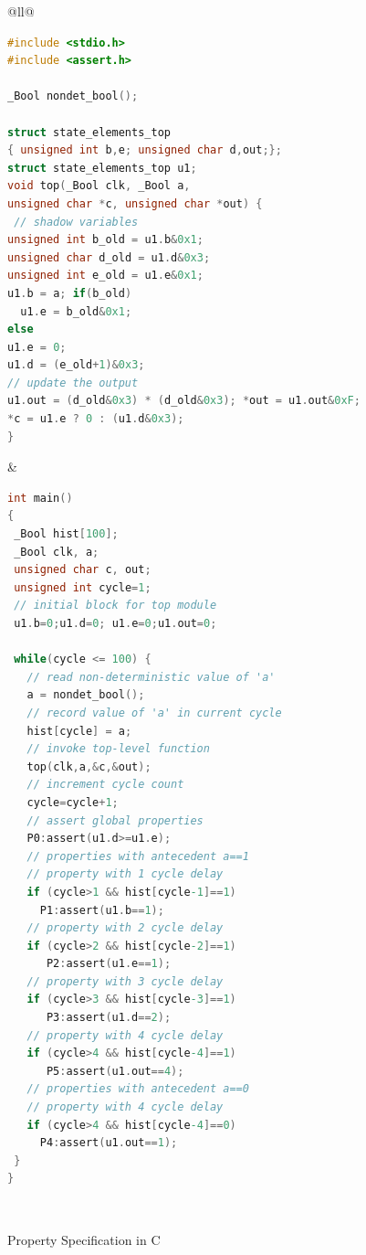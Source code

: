 \begin{figure}[bth]
\small
\begin{center}
\begin{tabular}{@{}ll@{}}
\hline\noalign{\vskip0.25ex}
 \\
\hline
\begin{lstlisting}[boxpos=t,mathescape=true,language=C,basicstyle=\scriptsize\ttfamily]
#include <stdio.h>
#include <assert.h>

_Bool nondet_bool(); 

struct state_elements_top 
{ unsigned int b,e; unsigned char d,out;};
struct state_elements_top u1;
void top(_Bool clk, _Bool a,
unsigned char *c, unsigned char *out) {
 // shadow variables
unsigned int b_old = u1.b&0x1; 
unsigned char d_old = u1.d&0x3; 
unsigned int e_old = u1.e&0x1;
u1.b = a; if(b_old)
  u1.e = b_old&0x1;
else
u1.e = 0;
u1.d = (e_old+1)&0x3;
// update the output
u1.out = (d_old&0x3) * (d_old&0x3); *out = u1.out&0xF;
*c = u1.e ? 0 : (u1.d&0x3);
}
\end{lstlisting}
& 
\begin{lstlisting}[boxpos=t,mathescape=true,language=C,basicstyle=\scriptsize\ttfamily]
int main() 
{
 _Bool hist[100];
 _Bool clk, a;
 unsigned char c, out;
 unsigned int cycle=1;
 // initial block for top module
 u1.b=0;u1.d=0; u1.e=0;u1.out=0; 
 
 while(cycle <= 100) {
   // read non-deterministic value of 'a'
   a = nondet_bool(); 
   // record value of 'a' in current cycle
   hist[cycle] = a;
   // invoke top-level function
   top(clk,a,&c,&out);
   // increment cycle count
   cycle=cycle+1; 
   // assert global properties 
   P0:assert(u1.d>=u1.e);
   // properties with antecedent a==1 
   // property with 1 cycle delay
   if (cycle>1 && hist[cycle-1]==1) 
     P1:assert(u1.b==1);
   // property with 2 cycle delay
   if (cycle>2 && hist[cycle-2]==1)
      P2:assert(u1.e==1); 
   // property with 3 cycle delay
   if (cycle>3 && hist[cycle-3]==1)
      P3:assert(u1.d==2); 
   // property with 4 cycle delay
   if (cycle>4 && hist[cycle-4]==1)
      P5:assert(u1.out==4); 
   // properties with antecedent a==0
   // property with 4 cycle delay
   if (cycle>4 && hist[cycle-4]==0) 
     P4:assert(u1.out==1);
 }
}
\end{lstlisting}\\
\hline
\end{tabular}
\caption{Property Specification in C}
\label{fig:sva}
\end{center}
\end{figure}

